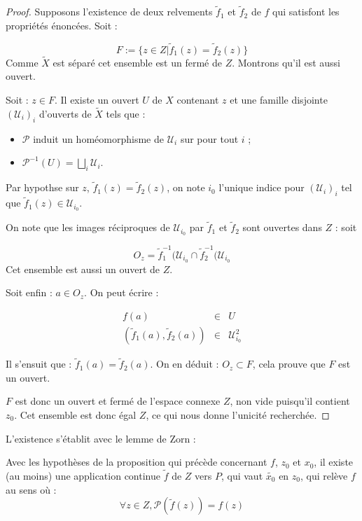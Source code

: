\begin{proof}
Supposons l'existence de deux relvements $\tilde{f}_1$ et $\tilde{f}_2$ de $f$ qui satisfont les propri\'et\'es \'enonc\'ees. Soit :

\[F:=\{z\in Z|\tilde{f}_1(z)=\tilde{f}_2(z)\}\]
Comme $\tilde{X}$ est s\'epar\'e cet ensemble est un ferm\'e de $Z$. Montrons qu'il est aussi ouvert.

\par
Soit : $z\in F$. Il existe un ouvert $U$ de $X$ contenant $z$ et une famille disjointe $(\mathcal{U}_i)_i$ d'ouverts de $\tilde{X}$ tels que :

\begin{itemize}
\item $\mathcal{P}$ induit un hom\'eomorphisme de $\mathcal{U}_i$ sur pour tout $i$ ;
\item $\mathcal{P}^{-1}(U)=\bigsqcup\limits_i \mathcal{U}_i$.
\end{itemize}

Par hypothse sur $z$, $\tilde{f}_1(z)=\tilde{f}_2(z)$, on note $i_0$ l'unique indice pour $(\mathcal{U}_i)_i$ tel que $\tilde{f}_1(z)\in\mathcal{U}_{i_0}$.

\par
On note que les images r\'eciproques de $\mathcal{U}_{i_0}$ par $\tilde{f}_1$ et $\tilde{f}_2$ sont ouvertes dans $Z$ : soit

\[O_z=\tilde{f}_1^{-1}(\mathcal{U}_{i_0}\cap \tilde{f}_2^{-1}(\mathcal{U}_{i_0}\]
Cet ensemble est aussi un ouvert de $Z$.

Soit enfin : $a\in O_z$. On peut \'ecrire :

\[%
\begin{array}{ccc}
f(a)&\in&U\\
(\tilde{f}_1(a),\tilde{f}_2(a))&\in&\mathcal{U}_{i_0}^2
\end{array}
\]

Il s'ensuit que : $\tilde{f}_1(a)=\tilde{f}_2(a)$. On en d\'eduit : $O_z\subset F$, cela prouve que $F$ est un ouvert.

\par
$F$ est donc un ouvert et ferm\'e de l'espace connexe $Z$, non vide puisqu'il contient $z_0$. Cet ensemble est donc \'egal  $Z$, ce qui nous donne l'unicit\'e recherch\'ee.
\end{proof}

L'existence s'\'etablit avec le lemme de Zorn :

\begin{prop}
Avec les hypoth\`eses de la proposition qui pr\'ec\`ede concernant $f$, $z_0$ et $x_0$, il existe (au moins) une application continue $\tilde{f}$ de $Z$ vers $P$, %
qui vaut $\tilde{x_0}$ en $z_0$, qui rel\`eve $f$ au sens o\`u :
\[\forall z\in Z, \mathcal{P}(\tilde{f}(z))=f(z)\]
\end{prop}

